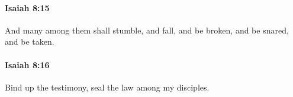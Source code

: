 		\paragraph{Isaiah 8:15} %
			\label{ISAIAH-8-15}

			And many among them shall stumble, and fall, and be broken, and be snared, and be taken.


		\paragraph{Isaiah 8:16} %
			\label{ISAIAH-8-16}

			Bind up the testimony, seal the law among my disciples.


